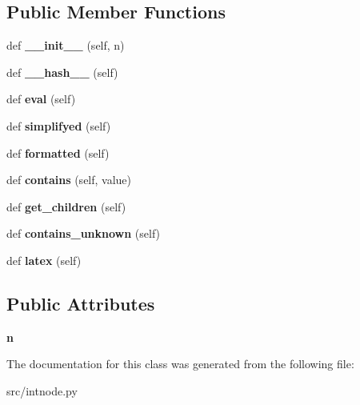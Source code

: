 \subsection*{Public Member Functions}
\begin{DoxyCompactItemize}
\item 
\mbox{\label{classsrc_1_1intnode_1_1IntNode_afa6814e2e067d1344f4d523c2d1d03ec}} 
def {\bfseries \+\_\+\+\_\+init\+\_\+\+\_\+} (self, n)
\item 
\mbox{\label{classsrc_1_1intnode_1_1IntNode_a2a0e6ad7ca6d6789e73fc7926f78198d}} 
def {\bfseries \+\_\+\+\_\+hash\+\_\+\+\_\+} (self)
\item 
\mbox{\label{classsrc_1_1intnode_1_1IntNode_a3c3758fa9303abfbe9ce07ea4299ef47}} 
def {\bfseries eval} (self)
\item 
\mbox{\label{classsrc_1_1intnode_1_1IntNode_aa0626a04aaf98541d2265fed11926ba5}} 
def {\bfseries simplifyed} (self)
\item 
\mbox{\label{classsrc_1_1intnode_1_1IntNode_ac062b5a24b3b320628feeba54e2b4d14}} 
def {\bfseries formatted} (self)
\item 
\mbox{\label{classsrc_1_1intnode_1_1IntNode_ac31637612bd5ac0321833af46ec4a284}} 
def {\bfseries contains} (self, value)
\item 
\mbox{\label{classsrc_1_1intnode_1_1IntNode_aa4a42ff77fb10c1775b860a16c6c1a06}} 
def {\bfseries get\+\_\+children} (self)
\item 
\mbox{\label{classsrc_1_1intnode_1_1IntNode_af79b733bb531756ef27e27fcc0300fd6}} 
def {\bfseries contains\+\_\+unknown} (self)
\item 
\mbox{\label{classsrc_1_1intnode_1_1IntNode_aa816f0f1c1c8df30e9e9615572b700b9}} 
def {\bfseries latex} (self)
\end{DoxyCompactItemize}
\subsection*{Public Attributes}
\begin{DoxyCompactItemize}
\item 
\mbox{\label{classsrc_1_1intnode_1_1IntNode_a976ab1aa8188e41167af1b0a76050352}} 
{\bfseries n}
\end{DoxyCompactItemize}


The documentation for this class was generated from the following file\+:\begin{DoxyCompactItemize}
\item 
src/intnode.\+py\end{DoxyCompactItemize}
